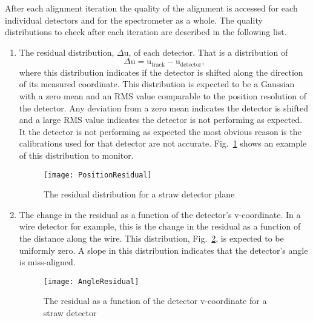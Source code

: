After each alignment iteration the quality of the alignment is accessed for each
individual detectors and for the spectrometer as a whole.  The quality
distributions to check after each iteration are described in the following list.

\begin{enumerate}[label=\roman*)]
\item The residual distribution, $\Delta$u, of each detector.  That is a
  distribution of
  \begin{equation}
    \Delta \mathrm{u} =
    \mathrm{u}_{\mathrm{track}} - \mathrm{u}_{\mathrm{detector}},
  \end{equation}
  where this distribution indicates if the detector is shifted along the
  direction of its measured coordinate.  This distribution is expected to be a
  Gaussian with a zero mean and an RMS value comparable to the position
  resolution of the detector.  Any deviation from a zero mean indicates the
  detector is shifted and a large RMS value indicates the detector is not
  performing as expected.  It the detector is not performing as expected the
  most obvious reason is the calibrations used for that detector are not
  accurate.  Fig.~\ref{fig::PositionResidual} shows an example of this
  distribution to monitor.
  \begin{figure}[h!t]
  \centering \texttt{[image: PositionResidual]}
  \caption{The residual distribution for a straw detector plane}
  \label{fig::PositionResidual}
  
\end{figure}
\item The change in the residual as a function of the detector's v-coordinate.
  In a wire detector for example, this is the change in the residual as a
  function of the distance along the wire.  This distribution,
  Fig.~\ref{fig::AngleResidual}, is expected to be uniformly zero.  A slope in
  this distribution indicates that the detector's angle is miss-aligned.
  \begin{figure}[h!t]
    \centering \texttt{[image: AngleResidual]}
    \caption{The residual as a function of the detector v-coordinate for a straw
      detector}
    \label{fig::AngleResidual}
  \end{figure}
  

\end{enumerate}
